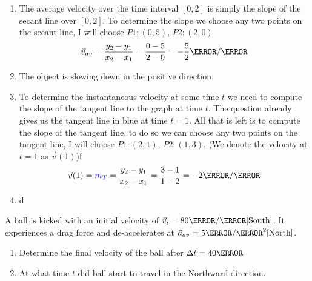\documentclass[12pt]{article} %
\newcommand{\tx}[1]{\text{#1}}
\begin{document}
\begin{qstn}[5]
    \begin{soln}

    \begin{enumerate}[label = (\alph*)]
        \item The average velocity over the time interval $[0,2]$ is simply the slope of the secant line over $[0,2]$. To determine the slope we choose any two points on the secant line, I will choose $P1 \colon (0,5)$, $P2 \colon (2,0)$
        $$\vec v_{av} = \frac{y_2 - y_1}{x_2 - x_1} = \frac{0 - 5}{2 - 0} = -\frac{5}{2} \m / \s$$
        

        \item The object is slowing down in the positive direction. 
        \item To determine the instantaneous velocity at some time $t$ we need to compute the slope of the tangent line to the graph at time $t$. The question already gives us the tangent line in blue at time $t = 1$. All that is left is to compute the slope of the tangent line, to do so we can choose any two points on the tangent line, I will choose $P1 \colon (2,1)$, $P2 \colon (1,3)$. (We denote the velocity at $t = 1$ as $\vec v(1)$)f
        $$\vec v(1) = \textcolor{blue}{m_T} = \frac{y_2 - y_1}{x_2 - x_1}= \frac{3 - 1}{1 - 2} = -2 \m / \s$$
        \item d

     \end{enumerate}

    \end{soln}

 \end{qstn}

\begin{qstn}[6]
 A ball is kicked with an initial velocity of $\vec v_i = 80 \m / \s \tx{[South]}$. It experiences a drag force and de-accelerates at $\vec a_{av} = 5 \m / \s^2 \tx{[North]}$.
            \begin{enumerate}[label = (\alph*)]
                \item Determine the final velocity of the ball after $\Delta t = 40\s$
                \item At what time $t$ did ball start to travel in the Northward direction.
            \end{enumerate}
\end{qstn}
        
\end{document}
